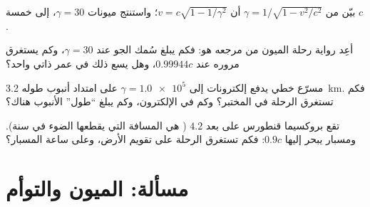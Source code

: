 \begin{exercise}[$\star\star\star$]\label{exo:g12:special-relativity:12}
بيّن من $\gamma = 1/\sqrt{1 - v^2/c^2}$ أن $v = c\sqrt{1 - 1/\gamma^2}$؛
واستنتج  ميونات $\gamma = 30$، إلى خمسة 
 $c$.
\end{exercise}

\begin{exercise}[$\star\star\star$]\label{exo:g12:special-relativity:13}
أعِد رواية رحلة الميون من مرجعه هو: فكم يبلغ سُمك الجو
عند $\gamma = 30$، وكم يستغرق مروره عند $0.99944c$، وهل يسع ذلك
في عمر ذاتي واحد؟
\end{exercise}

\begin{exercise}[$\star\star\star$]\label{exo:g12:special-relativity:14}
مسرّع خطي يدفع إلكترونات إلى $\gamma = \num{1.0e5}$ على امتداد أنبوب طوله
\qty{3.2}{km}. فكم تستغرق الرحلة في المختبر؟ وكم في
 الإلكترون، وكم يبلغ ``طول'' الأنبوب هناك؟
\end{exercise}

\begin{exercise}[$\star\star\star$]\label{exo:g12:special-relativity:15}
تقع بروكسيما قنطورس على بعد $4.2$  ( هي المسافة
التي يقطعها الضوء في سنة). ومسبار يبحر إليها  $0.9c$: فكم تستغرق
الرحلة على تقويم الأرض، وعلى ساعة المسبار؟
\end{exercise}

\section{مسألة: الميون والتوأم}

